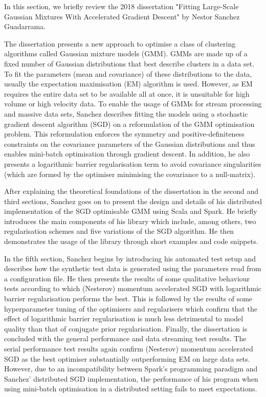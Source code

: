 \documentclass{article}
\begin{document}
In this section, we briefly review the 2018 dissertation "Fitting Large-Scale Gaussian Mixtures With Accelerated Gradient Descent" \cite{sanchez2018} by Nestor Sanchez Guadarrama.

The dissertation presents a new approach to optimise a class of clustering algorithms called Gaussian mixture models (GMM). GMMs are made up of a fixed number of Gaussian distributions that best describe clusters in a data set. To fit the parameters (mean and covariance) of these distributions to the data, usually the expectation maximisation (EM) algorithm is used. However, as EM requires the entire data set to be available all at once, it is unsuitable for high volume or high velocity data. To enable the usage of GMMs for stream processing and massive data sets, Sanchez describes fitting the models using a stochastic gradient descent algorithm (SGD) on a reformulation of the GMM optimisation problem. This reformulation enforces the symmetry and positive-definiteness constraints on the covariance parameters of the Gaussian distributions and thus enables mini-batch optimisation through gradient descent. In addition, he also presents a logarithmic barrier regularisation term to avoid covariance singularities (which are formed by the optimiser minimising the covariance to a null-matrix).

After explaining the theoretical foundations of the dissertation in the second and third sections, Sanchez goes on to present the design and details of his distributed implementation of the SGD optimisable GMM using Scala and Spark. He briefly introduces the main components of his library which include, among others, two regularisation schemes and five variations of the SGD algorithm. He then demonstrates the usage of the library through short examples and code snippets.

In the fifth section, Sanchez begins by introducing his automated test setup and describes how the synthetic test data is generated using the parameters read from a configuration file. He then presents the results of some qualitative behaviour tests according to which (Nesterov) momentum accelerated SGD with logarithmic barrier regularisation performs the best. This is followed by the results of some hyperparameter tuning of the optimisers and regularisers which confirm that the effect of logarithmic barrier regularisation is much less detrimental to model quality than that of conjugate prior regularisation. Finally, the dissertation is concluded with the general performance and data streaming test results. The serial performance test results again confirm (Nesterov) momentum accelerated SGD as the best optimiser substantially outperforming EM on large data sets. However, due to an incompatibility between Spark's programming paradigm and Sanchez' distributed SGD implementation, the performance of his program when using mini-batch optimisation in a distributed setting fails to meet expectations.
\end{document}
